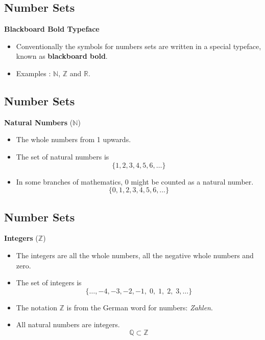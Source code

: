 \documentclass[]{report}
\begin{document}
\newpage


\subsection{Number Sets}

\textbf{Blackboard Bold Typeface}

\begin{itemize}
\item Conventionally the symbols for numbers sets are written in a special typeface, known as \textbf{blackboard bold}.
\item Examples : $\mathbb{N}$, $\mathbb{Z}$ and $\mathbb{R}$.

\end{itemize}


\subsection{Number Sets}

\textbf{Natural Numbers} ($\mathbb{N}$)
\begin{itemize}
\item The whole numbers from 1 upwards. 

\item The set of natural numbers is 
\[\{1,2,3,4,5,6,\ldots\} \]
\item In some branches of mathematics, $0$ might be counted as a natural number.
\[\{0,1,2,3,4,5,6,\ldots\} \]
\end{itemize}
 

 
 \subsection{Number Sets}
 
 
 \textbf{Integers} ($\mathbb{Z}$)
 \begin{itemize}
 \item The integers are all the whole numbers, all the negative whole numbers and zero.
 
 \item The set of integers is 
 \[\{\ldots,-4,-3,-2,-1,\;0,\;1,\;2,\;3,\ldots\} \]
 \item The notation $\mathbb{Z}$ is from the German word for numbers: \textit{Zahlen}. 
 \item All natural numbers are integers.
 \[ \mathbb{Q}  \subset \mathbb{Z}\]
 \end{itemize}
  
\end{document}
